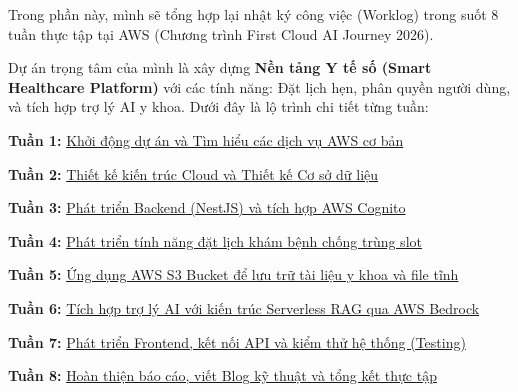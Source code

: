 Trong phần này, mình sẽ tổng hợp lại nhật ký công việc (Worklog) trong
suốt 8 tuần thực tập tại AWS (Chương trình First Cloud AI Journey 2026).

Dự án trọng tâm của mình là xây dựng \textbf{Nền tảng Y tế số (Smart
Healthcare Platform)} với các tính năng: Đặt lịch hẹn, phân quyền người
dùng, và tích hợp trợ lý AI y khoa. Dưới đây là lộ trình chi tiết từng
tuần:

\textbf{Tuần 1:} \href{1.1-week1/}{Khởi động dự án và Tìm hiểu các dịch
vụ AWS cơ bản}

\textbf{Tuần 2:} \href{1.2-week2/}{Thiết kế kiến trúc Cloud và Thiết kế
Cơ sở dữ liệu}

\textbf{Tuần 3:} \href{1.3-week3/}{Phát triển Backend (NestJS) và tích
hợp AWS Cognito}

\textbf{Tuần 4:} \href{1.4-week4/}{Phát triển tính năng đặt lịch khám
bệnh chống trùng slot}

\textbf{Tuần 5:} \href{1.5-week5/}{Ứng dụng AWS S3 Bucket để lưu trữ tài
liệu y khoa và file tĩnh}

\textbf{Tuần 6:} \href{1.6-week6/}{Tích hợp trợ lý AI với kiến trúc
Serverless RAG qua AWS Bedrock}

\textbf{Tuần 7:} \href{1.7-week7/}{Phát triển Frontend, kết nối API và
kiểm thử hệ thống (Testing)}

\textbf{Tuần 8:} \href{1.8-week8/}{Hoàn thiện báo cáo, viết Blog kỹ
thuật và tổng kết thực tập}

